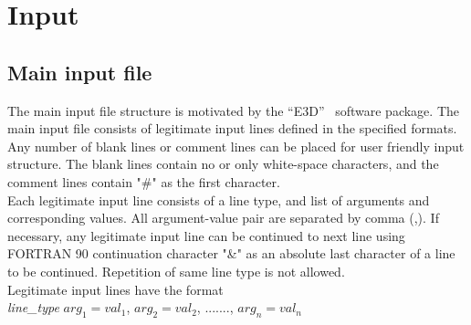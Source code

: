 \chapter{Input}
\label{chap:input}
\section{Main input file}

The main input file structure is motivated by the ``E3D''~\citep{larsen1995} software package. The main input file consists of legitimate input lines defined in the specified formats. Any number of blank lines or comment lines can be placed for user friendly input structure. The blank lines contain no or only white-space characters, and the comment lines contain "\#" as the first character. \\

Each legitimate input line consists of a line type, and list of arguments and corresponding values. All argument-value pair are separated by comma (,). If necessary, any legitimate input line can be continued to next line using FORTRAN 90 continuation  character "\&" as an absolute last character of a line to be continued. Repetition of same line type is not allowed.\\

Legitimate input lines have the format\\
{\it{line\_type}} $arg_1=val_1$, $arg_2=val_2$, ......., $arg_n=val_n$\\

